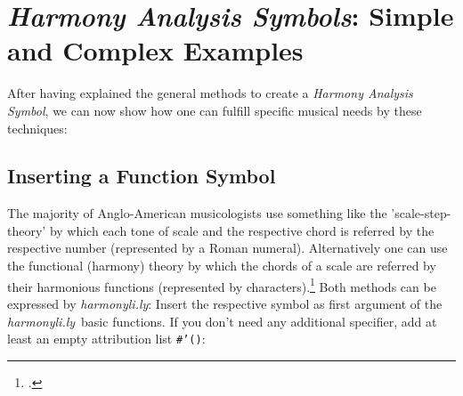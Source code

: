 \documentclass[
  DIV=calc,
  BCOR=5mm,
  12pt,
  headings=small,
  oneside,
  abstract=true,
  toc=bib,
  xcolor=dvipsnames,
  openany,
  ngerman,english]{scrartcl}
\newcommand{\hlyn}[0]{\textit{harmonyli.ly}}
\newcommand{\has}[1]{\textit{Harmony Analysis Symbol#1}}
\begin{document}
\begin{center}
\end{center}

\section{\has{s}: Simple and Complex Examples}

After having explained the general methods to create a \has{}, we can now show
how one can fulfill specific musical needs by these techniques:

\subsection{Inserting a Function Symbol}

The majority of Anglo-American musicologists use something like the
'scale-step-theory' by which each tone of scale and the respective chord is
referred by the respective number (represented by a Roman numeral).
Alternatively one can use the functional (harmony) theory by which the chords of
a scale are referred by their harmonious functions (represented by
characters).\footcite[for dedails cf.][\nopage wp]{wpFunctionTheory2019a} Both
methods can be expressed by \hlyn: Insert the respective symbol as first
argument of the \hlyn\ basic functions. If you don't need any additional
specifier, add at least an empty attribution list \texttt{\#'()}:
\end{document}
